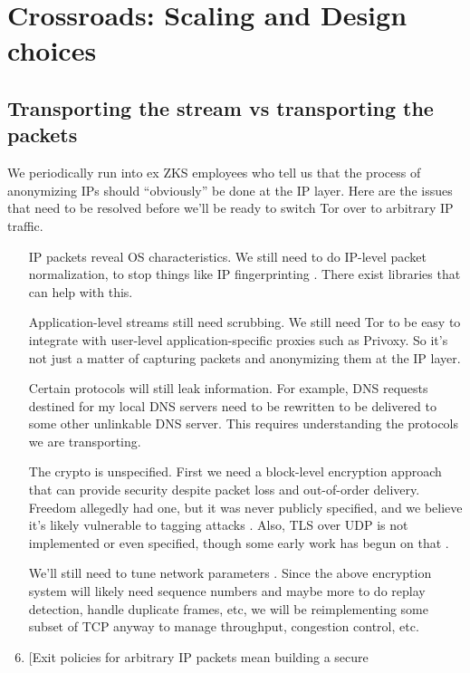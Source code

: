 \documentclass{llncs}
\begin{document}
\section{Crossroads: Scaling and Design choices}
\label{sec:crossroads-design}

\subsection{Transporting the stream vs transporting the packets}

We periodically run into ex ZKS employees who tell us that the process of
anonymizing IPs should ``obviously'' be done at the IP layer. Here are
the issues that need to be resolved before we'll be ready to switch Tor
over to arbitrary IP traffic.

\begin{enumerate}
\setlength{\itemsep}{0mm}
\setlength{\parsep}{0mm}
\item [IP packets reveal OS characteristics.] We still need to do
IP-level packet normalization, to stop things like IP fingerprinting
\cite{ip-fingerprinting}. There exist libraries \cite{ip-normalizing}
that can help with this.
\item [Application-level streams still need scrubbing.] We still need
Tor to be easy to integrate with user-level application-specific proxies
such as Privoxy. So it's not just a matter of capturing packets and
anonymizing them at the IP layer.
\item [Certain protocols will still leak information.] For example,
DNS requests destined for my local DNS servers need to be rewritten
to be delivered to some other unlinkable DNS server. This requires
understanding the protocols we are transporting.
\item [The crypto is unspecified.] First we need a block-level encryption
approach that can provide security despite
packet loss and out-of-order delivery. Freedom allegedly had one, but it was
never publicly specified, and we believe it's likely vulnerable to tagging
attacks \cite{tor-design}. Also, TLS over UDP is not implemented or even
specified, though some early work has begun on that \cite{ben-tls-udp}.
\item [We'll still need to tune network parameters]. Since the above
encryption system will likely need sequence numbers and maybe more to do
replay detection, handle duplicate frames, etc, we will be reimplementing
some subset of TCP anyway to manage throughput, congestion control, etc.
\item [Exit policies for arbitrary IP packets mean building a secure

\end{enumerate}
\end{document}
